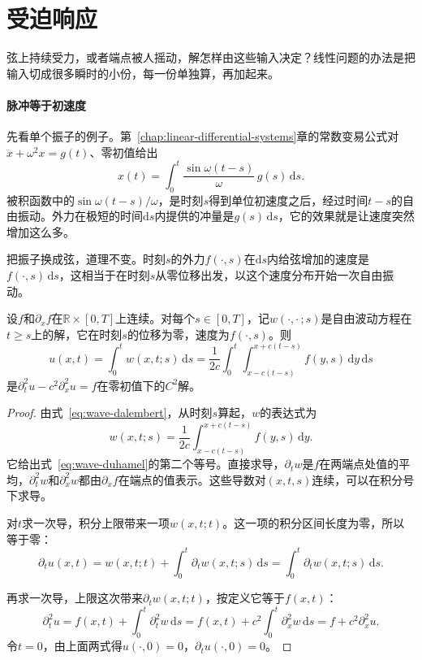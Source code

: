 \section{受迫响应}
\label{sec:wave-forced}

弦上持续受力，或者端点被人摇动，解怎样由这些输入决定？线性问题的办法是把输入切成很多瞬时的小份，每一份单独算，再加起来。

\paragraph{脉冲等于初速度}
先看单个振子的例子。第~\ref{chap:linear-differential-systems}章的常数变易公式对$\ddot{x}+\omega^{2}x=g(t)$、零初值给出
\[
 x(t)=\int_0^{t}\frac{\sin\omega(t-s)}{\omega}\,g(s)\,\mathrm{d}s .
\]
被积函数中的$\sin\omega(t-s)/\omega$，是时刻$s$得到单位初速度之后，经过时间$t-s$的自由振动。外力在极短的时间$\mathrm{d}s$内提供的冲量是$g(s)\,\mathrm{d}s$，它的效果就是让速度突然增加这么多。

把振子换成弦，道理不变。时刻$s$的外力$f(\cdot,s)$在$\mathrm{d}s$内给弦增加的速度是$f(\cdot,s)\,\mathrm{d}s$，这相当于在时刻$s$从零位移出发，以这个速度分布开始一次自由振动。

\begin{theorem}
\label{thm:wave-duhamel}
设$f$和$\partial_xf$在$\mathbb{R}\times[0,T]$上连续。对每个$s\in[0,T]$，记$w(\cdot,\cdot\,;s)$是自由波动方程在$t\geq s$上的解，它在时刻$s$的位移为零，速度为$f(\cdot,s)$。则
\begin{equation}
 u(x,t)=\int_0^{t}w(x,t;s)\,\mathrm{d}s=\frac1{2c}\int_0^{t}\int_{x-c(t-s)}^{x+c(t-s)}f(y,s)\,\mathrm{d}y\,\mathrm{d}s
 \label{eq:wave-duhamel}
\end{equation}
是$\partial_t^{2}u-c^{2}\partial_x^{2}u=f$在零初值下的$C^{2}$解。
\end{theorem}

\begin{proof}
由式~\eqref{eq:wave-dalembert}，从时刻$s$算起，$w$的表达式为
\[
 w(x,t;s)=\frac1{2c}\int_{x-c(t-s)}^{x+c(t-s)}f(y,s)\,\mathrm{d}y .
\]
它给出式~\eqref{eq:wave-duhamel}的第二个等号。直接求导，$\partial_tw$是$f$在两端点处值的平均，$\partial_t^{2}w$和$\partial_x^{2}w$都由$\partial_xf$在端点的值表示。这些导数对$(x,t,s)$连续，可以在积分号下求导。

对$t$求一次导，积分上限带来一项$w(x,t;t)$。这一项的积分区间长度为零，所以等于零：
\[
 \partial_tu(x,t)=w(x,t;t)+\int_0^{t}\partial_tw(x,t;s)\,\mathrm{d}s=\int_0^{t}\partial_tw(x,t;s)\,\mathrm{d}s .
\]

再求一次导，上限这次带来$\partial_tw(x,t;t)$，按定义它等于$f(x,t)$：
\[
 \partial_t^{2}u=f(x,t)+\int_0^{t}\partial_t^{2}w\,\mathrm{d}s=f(x,t)+c^{2}\int_0^{t}\partial_x^{2}w\,\mathrm{d}s=f+c^{2}\partial_x^{2}u .
\]
令$t=0$，由上面两式得$u(\cdot,0)=0$，$\partial_tu(\cdot,0)=0$。
\end{proof}

